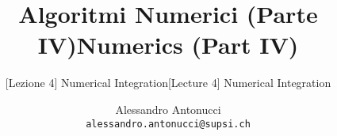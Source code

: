 \documentclass[professionalfonts]{beamer}
\title{Algoritmi Numerici (Parte IV)}
\subtitle{[Lezione 4] Numerical Integration}
\title{Numerics (Part IV)}
\subtitle{[Lecture 4] Numerical Integration}
\date{}
\author{Alessandro Antonucci\\{\tt alessandro.antonucci@supsi.ch}}
\newif\ifita
\begin{document}
\maketitle
\setbeamercovered{}


\end{document}
